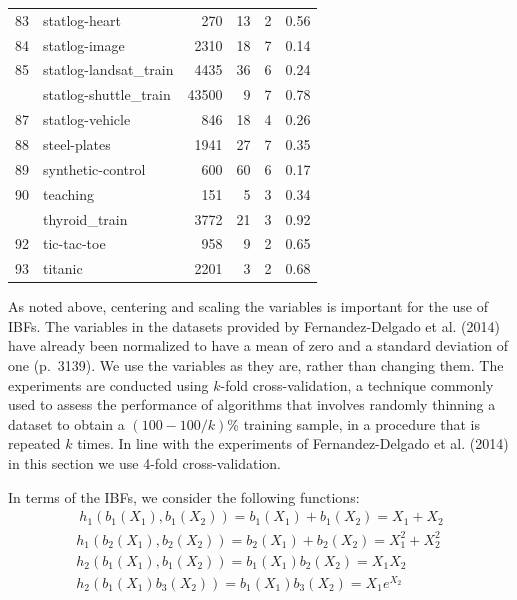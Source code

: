 \documentclass[]{elsarticle} %
\begin{document}
\begin{longtable}[t]{rlrrrr}
83 & statlog-heart & 270 & 13 & 2 & 0.56\\
84 & statlog-image & 2310 & 18 & 7 & 0.14\\
85 & statlog-landsat\_train & 4435 & 36 & 6 & 0.24\\
\addlinespace
86 & statlog-shuttle\_train & 43500 & 9 & 7 & 0.78\\
87 & statlog-vehicle & 846 & 18 & 4 & 0.26\\
88 & steel-plates & 1941 & 27 & 7 & 0.35\\
89 & synthetic-control & 600 & 60 & 6 & 0.17\\
90 & teaching & 151 & 5 & 3 & 0.34\\
\addlinespace
91 & thyroid\_train & 3772 & 21 & 3 & 0.92\\
92 & tic-tac-toe & 958 & 9 & 2 & 0.65\\
93 & titanic & 2201 & 3 & 2 & 0.68\\*
\end{longtable}

As noted above, centering and scaling the variables is important for the
use of IBFs. The variables in the datasets provided by Fernandez-Delgado
et al. (2014) have already been normalized to have a mean of zero and a
standard deviation of one (p.~3139). We use the variables as they are,
rather than changing them. The experiments are conducted using
\(k\)-fold cross-validation, a technique commonly used to assess the
performance of algorithms that involves randomly thinning a dataset to
obtain a \((100 - 100/k)\)\% training sample, in a procedure that is
repeated \(k\) times. In line with the experiments of Fernandez-Delgado
et al. (2014) in this section we use 4-fold cross-validation.

In terms of the IBFs, we consider the following functions: \[
\begin{array}{c}\
h_1(b_1(X_1),b_1(X_2))=b_1(X_1)+b_1(X_2)=X_1+X_2\\
h_1(b_2(X_1),b_2(X_2))=b_2(X_1)+b_2(X_2)=X_1^2+X_2^2\\
h_2(b_1(X_1),b_1(X_2))=b_1(X_1)b_2(X_2)=X_1X_2\\
h_2(b_1(X_1)b_3(X_2))=b_1(X_1)b_3(X_2)=X_1e^{X_2}
\end{array}
\]
\end{document}
